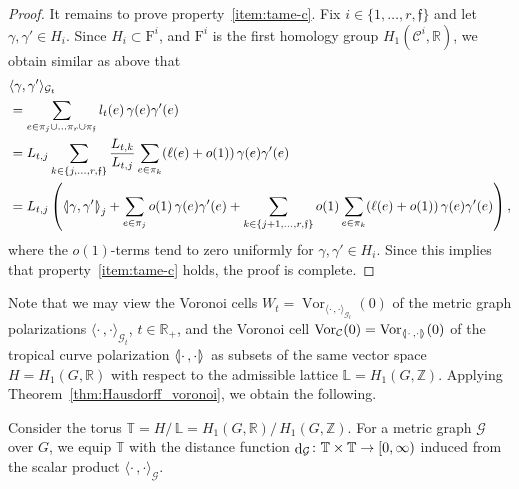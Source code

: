 \documentclass[AHL,Unicode,longabstracts]{cedram}
\makeatletter
\newcommand{\innone}[2]{{\langle#2\rangle_{#1}}}
\newcommand{\llangle}{\mathopen{\langle\mkern -3.1mu\lvert}}
\newcommand{\rrangle}{\mathclose{\rvert\mkern -3.1mu\rangle}}
\newcommand{\highinn}[2]{{\llangle#2\rrangle_{#1}}}
\newcommand{\rquot}[2]{#1/\,#2}
\DeclareMathOperator{\Vor}{Vor}
\DeclareMathOperator{\dist}{d}
\newcommand{\filter}{\mathrm{F}}
\newcommand{\R}{\mathbb{R}}
\newcommand{\Z}{\mathbb{Z}}
\newcommand{\T}{\mathbb{T}}
\renewcommand{\L}{\mathbb{L}}
\newcommand{\mgr}{\mathcal{G}}
\newcommand{\curve}{\mathcal{C}}
\newcommand{\fin}{\mathfrak f}
\renewcommand*{\to}{\mathchoice{\longrightarrow}{\rightarrow}{\rightarrow}{\rightarrow}}
\let\save@mathaccent\mathaccent
\newcommand*\if@single[3]{%
  \setbox0\hbox{${\mathaccent"0362{#1}}^H$}%
  \setbox2\hbox{${\mathaccent"0362{\kern0pt#1}}^H$}%
  \ifdim\ht0=\ht2 #3\else #2\fi
  }
\newcommand*\rel@kern[1]{\kern#1\dimexpr\macc@kerna}
\newcommand*\widebar[1]{\@ifnextchar^{{\wide@bar{#1}{0}}}{\wide@bar{#1}{1}}}
\newcommand*\wide@bar[2]{\if@single{#1}{\wide@bar@{#1}{#2}{1}}{\wide@bar@{#1}{#2}{2}}}
\newcommand*\wide@bar@[3]{%
  \begingroup
  \def\mathaccent##1##2{%
    \let\mathaccent\save@mathaccent
    \if#32 \let\macc@nucleus\first@char \fi
    \setbox\z@\hbox{$\macc@style{\macc@nucleus}_{}$}%
    \setbox\tw@\hbox{$\macc@style{\macc@nucleus}{}_{}$}%
    \dimen@\wd\tw@
    \advance\dimen@-\wd\z@
    \divide\dimen@ 3
    \@tempdima\wd\tw@
    \advance\@tempdima-\scriptspace
    \divide\@tempdima 10
    \advance\dimen@-\@tempdima
    \ifdim\dimen@>\z@ \dimen@0pt\fi
    \rel@kern{0.6}\kern-\dimen@
    \if#31
      \overline{\rel@kern{-0.6}\kern\dimen@\macc@nucleus\rel@kern{0.4}\kern\dimen@}%
      \advance\dimen@0.4\dimexpr\macc@kerna
      \let\final@kern#2%
      \ifdim\dimen@<\z@ \let\final@kern1\fi
      \if\final@kern1 \kern-\dimen@\fi
    \else
      \overline{\rel@kern{-0.6}\kern\dimen@#1}%
    \fi
  }%
  \macc@depth\@ne
  \let\math@bgroup\@empty \let\math@egroup\macc@set@skewchar
  \mathsurround\z@ \frozen@everymath{\mathgroup\macc@group\relax}%
  \macc@set@skewchar\relax
  \let\mathaccentV\macc@nested@a
  \if#31
    \macc@nested@a\relax111{#1}%
  \else
    \def\gobble@till@marker##1\endmarker{}%
    \futurelet\first@char\gobble@till@marker#1\endmarker
    \ifcat\noexpand\first@char A\else
      \def\first@char{}%
    \fi
    \macc@nested@a\relax111{\first@char}%
  \fi
  \endgroup
}
\let\oldbar\bar
\renewcommand*{\bar}[1]{{\mathchoice{\widebar{#1}}{\widebar{#1}}{\widebar{#1}}{\oldbar{#1}}}}
\makeatother
\begin{document}
\begin{proof}
It remains to prove property~\eqref{item:tame-c}. Fix $i \in \{1, \dots, r, \fin \}$ and let $\gamma, \gamma'\in H_i$. Since $H_i \subset \filter^i$, and $\filter^i$ is the first homology group $H_1(\curve^i, \R)$, we obtain similar as above that
\begin{align*}
&\innone{\mgr_t}{\gamma, \gamma'} \\
&= \sum_{e \in \pi_j \cup \dots \pi_r \cup \pi_\fin} l_t(e) \, \gamma(e) \gamma'(e)\\
&= L_{t,j} \sum_{k \in \{j, \dots, r, \fin\}} \frac{L_{t,k}}{L_{t,j}} \sum_{e \in \pi_k} (\ell(e) + o(1)) \, \gamma(e) \gamma'(e) \\
& = L_{t,j}\left(\highinn{j}{\gamma, \gamma'} + \sum_{e \in \pi_j} o(1) \, \gamma(e) \gamma'(e) + \sum_{k \in \{j+1, \dots, r, \fin\}} o(1) \sum_{e \in \pi_k} (\ell(e) + o(1)) \, \gamma(e) \gamma'(e) \right),
\end{align*}
where the $o(1)$-terms tend to zero uniformly for $\gamma, \gamma' \in H_i$. Since this implies that property~\eqref{item:tame-c} holds, the proof is complete.
\end{proof}



Note that we may view the Voronoi cells $W_t = \Vor_{\innone{\mgr_t}{\cdot\,, \cdot}} (0)$ of the metric graph polarizations $\innone{\mgr_t}{\cdot \,, \cdot }$, $t \in \R_+$, and the Voronoi cell $ \Vor_{\curve}(0) =\Vor_{\highinn{}{\cdot \,, \cdot }}(0)$ of the tropical curve polarization $\highinn{}{\cdot \,, \cdot }$ as subsets of the same vector space $H= H_1(G, \R)$ with respect to the admissible lattice $\L= H_1(G, \Z)$. Applying Theorem~\ref{thm:Hausdorff_voronoi}, we obtain the following.


Consider the torus $\T = \rquot{H}{\L} = \rquot{H_1(G, \R)}{H_1(G, \Z)}$. For a metric graph $\mgr$ over $G$, we equip $\T$ with the distance function $\dist_\mgr \colon \T \times \T \to [0, \infty)$ induced from the scalar product $\innone{\mgr}{\cdot \,, \cdot}$.
\end{document}
